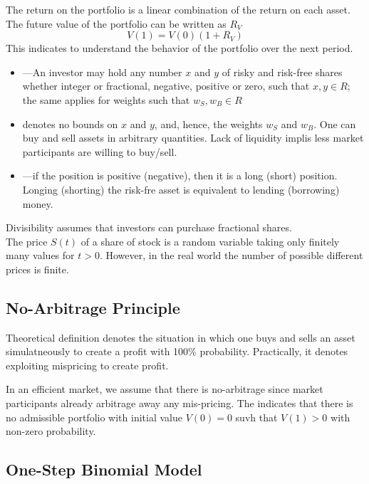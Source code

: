 \documentclass{article}
\begin{document}
The return on the portfolio is a linear combination of the return on each asset. The future value of the portfolio can be written as $R_V$ $$V(1) = V(0)(1+R_V)$$ This indicates to understand the behavior of the portfolio over the next period. 
\begin{itemize}
  \item {}---An investor may hold any number $x$ and $y$ of risky and risk-free shares whether integer or fractional, negative, positive or zero, such that $x,y \in R$; the same applies for weights such that $w_S , w_B \in R$ 
  \item {} denotes no bounds on $x$ and $y$, and, hence, the weights $w_S$ and $w_B$. One can buy and sell assets in arbitrary quantities. Lack of liquidity implis less market participants are willing to buy/sell.  
  \item {}---if the position is positive (negative), then it is a long (short) position. Longing (shorting) the risk-fre asset is equivalent to lending (borrowing) money. 
\end{itemize}
Divisibility assumes that investors can purchase fractional shares. \\ 

The price $S(t)$ of a share of stock is a random variable taking only finitely many values for $t > 0$. However, in the real world the number of possible different prices is finite. 

\subsection{No-Arbitrage Principle}

\begin{definition}[Arbitrage]
  Theoretical definition denotes the situation in which one buys and sells an asset simulatneously to create a profit with 100\% probability. Practically, it denotes exploiting mispricing to create profit. 
\end{definition}

In an efficient market, we assume that there is no-arbitrage since market participants already arbitrage away any mis-pricing. The  indicates that there is no admissible portfolio with initial value $V(0) = 0$ suvh that $V(1) > 0$ with non-zero probability. 

\subsection{One-Step Binomial Model}
\end{document}
